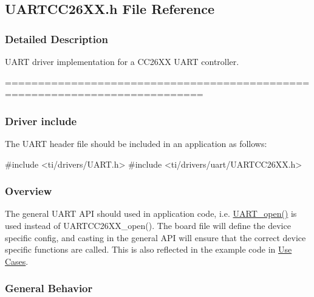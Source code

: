 \subsection{U\+A\+R\+T\+C\+C26\+X\+X.\+h File Reference}
\label{_u_a_r_t_c_c26_x_x_8h}


\subsubsection{Detailed Description}
U\+A\+R\+T driver implementation for a C\+C26\+X\+X U\+A\+R\+T controller. 

============================================================================

\subsubsection*{Driver include}

The U\+A\+R\+T header file should be included in an application as follows\+: 
\begin{DoxyCode}
\textcolor{preprocessor}{#include <ti/drivers/UART.h>}
\textcolor{preprocessor}{#include <ti/drivers/uart/UARTCC26XX.h>}
\end{DoxyCode}


\subsubsection*{Overview}

The general U\+A\+R\+T A\+P\+I should used in application code, i.\+e. \hyperlink{_u_a_r_t_8h_a0442ea1ec23901168da31726bb3254c1}{U\+A\+R\+T\+\_\+open()} is used instead of U\+A\+R\+T\+C\+C26\+X\+X\+\_\+open(). The board file will define the device specific config, and casting in the general A\+P\+I will ensure that the correct device specific functions are called. This is also reflected in the example code in \hyperlink{_u_a_r_t_c_c26_x_x_8h_USE_CASES}{Use Cases}.

\subsubsection*{General Behavior}


